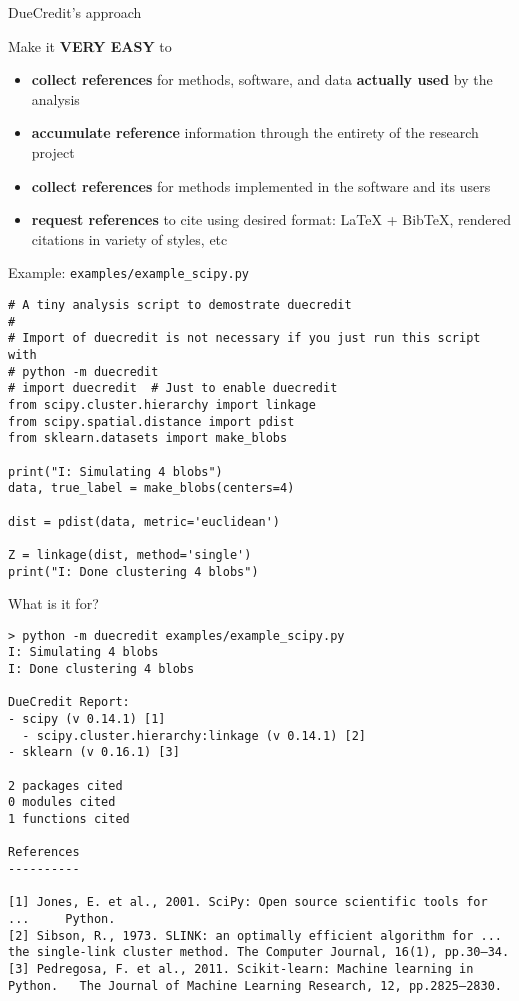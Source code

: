 \begin{frame}{DueCredit's approach}

Make it \textbf{VERY EASY} to
\begin{itemize}
\item \textbf{collect references} for methods, software, and data
  \textbf{actually used} by the analysis
\item \textbf{accumulate reference} information through the entirety of the
  research project
\item \textbf{collect references} for methods implemented in the
  software and its users
\item \textbf{request references} to cite using desired format: LaTeX
  + BibTeX, rendered citations in variety of styles, etc
\end{itemize}
\end{frame}

\begin{frame}[t,fragile]{Example: \texttt{examples/example\_scipy.py}}

\begin{verbatim}
# A tiny analysis script to demostrate duecredit
#
# Import of duecredit is not necessary if you just run this script with
# python -m duecredit
# import duecredit  # Just to enable duecredit
from scipy.cluster.hierarchy import linkage
from scipy.spatial.distance import pdist
from sklearn.datasets import make_blobs

print("I: Simulating 4 blobs")
data, true_label = make_blobs(centers=4)

dist = pdist(data, metric='euclidean')

Z = linkage(dist, method='single')
print("I: Done clustering 4 blobs")
\end{verbatim}
\end{frame}


\begin{frame}[t,fragile]{What is it for?}
\begin{Verbatim}[commandchars=\\\{\},fontsize=\scriptsize]
> python -m duecredit examples/example_scipy.py
I: Simulating 4 blobs
I: Done clustering 4 blobs

DueCredit Report:
- scipy (v 0.14.1) [1]
  - scipy.cluster.hierarchy:linkage (v 0.14.1) [2]
- sklearn (v 0.16.1) [3]

2 packages cited
0 modules cited
1 functions cited

References
----------

[1] Jones, E. et al., 2001. SciPy: Open source scientific tools for ...     Python.
[2] Sibson, R., 1973. SLINK: an optimally efficient algorithm for ...       the single-link cluster method. The Computer Journal, 16(1), pp.30–34.
[3] Pedregosa, F. et al., 2011. Scikit-learn: Machine learning in Python.   The Journal of Machine Learning Research, 12, pp.2825–2830.
\end{Verbatim}
\end{frame}


